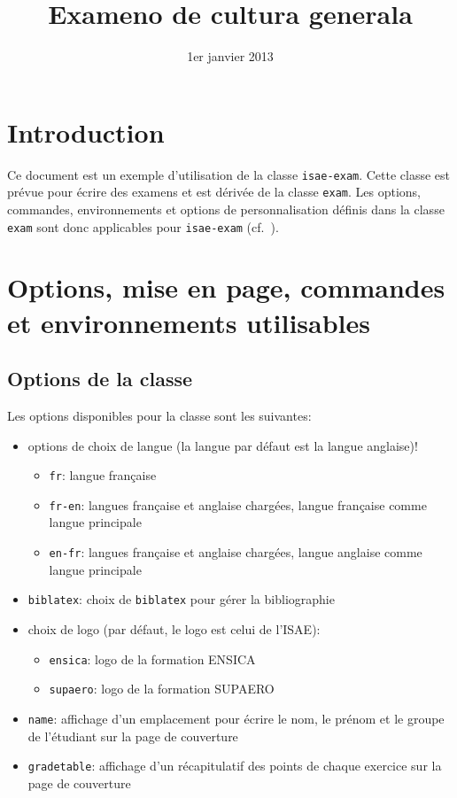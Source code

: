 \documentclass[addpoints,fr,biblatex,name,gradetable]{isae-exam}
\title[Ex. de cultura generala]{Exameno de cultura generala}
\date{1er janvier 2013}
\begin{document}
\begin{coverpages}
  \basiccoverpage{}
\end{coverpages}

\section{Introduction}
\label{sec:introduction}

Ce document est un exemple d'utilisation de la classe
\texttt{isae-exam}. Cette classe est prévue pour écrire des examens et
est dérivée de la classe \texttt{exam}. Les options, commandes,
environnements et options de personnalisation définis dans la classe
\texttt{exam} sont donc applicables pour \texttt{isae-exam}
(cf.~\cite{hirschorn11:_exam}).

\section{Options, mise en page, commandes et environnements
  utilisables}
\label{sec:options-etc}

\subsection{Options de la classe}
\label{sec:options}

Les options disponibles pour la classe sont les suivantes:

\begin{itemize}
\item options de choix de langue (la langue par défaut est la langue
  anglaise)!
  \begin{itemize}
  \item \lstinline!fr!: langue française
  \item \lstinline!fr-en!: langues française et anglaise chargées,
    langue française comme langue principale
  \item \lstinline!en-fr!: langues française et anglaise chargées,
    langue anglaise comme langue principale
  \end{itemize}
\item \lstinline!biblatex!: choix de \texttt{biblatex} pour gérer la
  bibliographie
\item choix de logo (par défaut, le logo est celui de l'ISAE):
  \begin{itemize}
  \item \lstinline!ensica!: logo de la formation ENSICA
  \item \lstinline!supaero!: logo de la formation SUPAERO
  \end{itemize}
\item \lstinline!name!: affichage d'un emplacement pour écrire le nom,
  le prénom et le groupe de l'étudiant sur la page de couverture
\item \lstinline!gradetable!: affichage d'un récapitulatif des points
  de chaque exercice sur la page de couverture
\end{itemize}
\end{document}
